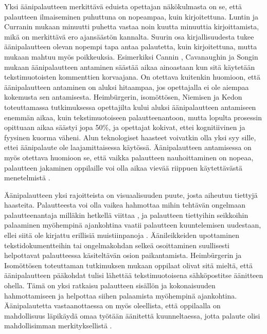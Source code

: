 \documentclass[utf8]{gradu3}
\begin{document}
Yksi äänipalautteen merkittävä eduista opettajan näkökulmasta on se, että palautteen ilmaiseminen puhuttuna on nopeampaa, kuin kirjoitettuna. Luntin ja Curranin \parencite[][]{areYouListening} mukaan minuutti puhetta vastaa noin kuutta minuuttia kirjoittamista, mikä on merkittävä ero ajansäästön kannalta. Suurin osa kirjallisuudesta tukee äänipalautteen olevan nopempi tapa antaa palautetta, kuin kirjoitettuna, mutta mukaan mahtuu myös poikkeuksia. Esimerkiksi Cannin \parencite[][]{engaging}, Cavanaughin ja Songin \parencite[][]{versus} mukaan äänipalautteen antaminen säästää aikaa ainoastaan kun sitä käytetään tekstimuotoisten kommenttien korvaajana. On otettava kuitenkin huomioon, että äänipalautteen antaminen on aluksi hitaampaa, jos opettajalla ei ole aiempaa kokemusta sen antamisesta. Heimbürgerin, isomöttösen, Niemisen ja Kedon \parencite[][]{academics} toteuttamassa tutkimuksessa opettajilta kului aluksi äänipalautteen antamiseen enemmän aikaa, kuin tekstimuotoiseen palautteenantoon, mutta lopulta prosessin opittuaan aikaa säästyi jopa 50\%, ja opettajat kokivat, ettei kognitiivinen ja fyysinen kuorma väheni. Alun teknologiset haasteet voivatkin olla yksi syy sille, ettei äänipalaute ole laajamittaisessa käytössä. Äänipalautteen antamisessa on myös otettava huomioon se, että vaikka palautteen nauhoittaminen on nopeaa, palautteen jakaminen oppilaille voi olla aikaa vievää riippuen käytettävästä menetelmistä \parencite[][]{engaging}.

Äänipalautteen yksi rajoitteista on visuaalisuuden puute, josta aiheutuu tiettyjä haasteita. Palautteesta voi olla vaikea hahmottaa mihin tehtävän ongelmaan palautteenantaja milläkin hetkellä viittaa \parencite[][]{versus}, ja palautteen tiettyihin seikkoihin palaaminen myöhempinä ajankohtina vaatii palautteen kuuntelemisen uudestaan, ellei siitä ole kirjattu erillisiä muistiinpanoja \parencite[][]{evaluating}. Äänileikkeiden upottaminen tekstidokumentteihin tai ongelmakohdan selkeä osoittaminen suullisesti helpottavat palautteessa käsiteltävän osion paikantamista. Heimbürgerin ja Isomöttösen \parencite[][]{moderating} toteuttaman tutkimuksen mukaan oppilaat olivat sitä mieltä, että äänipalautteen pääkohdat tulisi lähettää tekstimuotoisena sähköpostitse äänitteen ohella. Tämä on yksi ratkaisu palautteen sisällön ja kokonaisuuden hahmottamiseen ja helpottaa siihen palaamista myöhempinä ajankohtina. Äänipalautetta vastaanottaessa on myös oleellista, että oppilaalla on mahdollisuus läpikäydä omaa työtään äänitettä kuunneltaessa, jotta palaute olisi mahdollisimman merkityksellistä \parencite[][]{usingAudio}.
\end{document}
